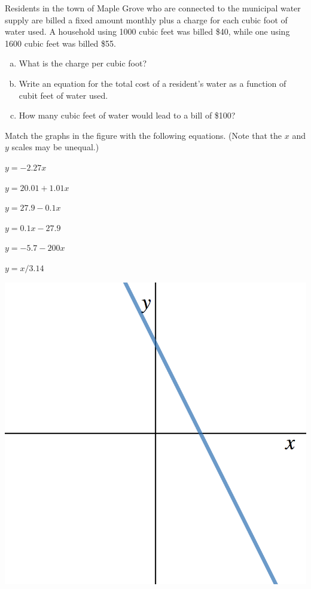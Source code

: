 \documentclass[11pt]{exam}
\theoremstyle{definition}
\begin{document}
\begin{questions}
\vskip 10mm
\pagebreak
\question
	Residents in the town of Maple Grove who are connected to the municipal water supply are billed a fixed amount monthly plus a charge for each cubic foot of water used. A household using 1000 cubic feet was billed \$40, while one using 1600 cubic feet was billed \$55.
\begin{enumerate}[(a)]
\item  What is the charge per cubic foot?
\item Write an equation for the total cost of a resident's water as a function of cubit feet of water used.
  \vspace{1in}
\item How many cubic feet of water would lead to a bill of \$100?
\end{enumerate}
\vspace{-0.5in}
\vspace{1.5in}
\question
	Match the graphs in the figure with the following equations. (Note that the \(x\) and \(y\) scales may be unequal.)
\vskip 5mm
\begin{enumerate}[(a)]
\begin{minipage}{.5\textwidth}
	\item $y=-2.27x$
	\item $y = 20.01+1.01x$
	\item $y=27.9-0.1x$
\end{minipage}
\begin{minipage}{0.5\textwidth}
	\item $y=0.1x-27.9$
	\item $y=-5.7-200x$
	\item $y=x/3.14$
\end{minipage}
\end{enumerate}
\vskip 5mm
\begin{enumerate}[(I)]
	\begin{minipage}{.35\textwidth}
	\item \includegraphics[scale=0.1]{Figures/linearI.png}

\end{minipage}
\end{enumerate}
\end{questions}
\end{document}
